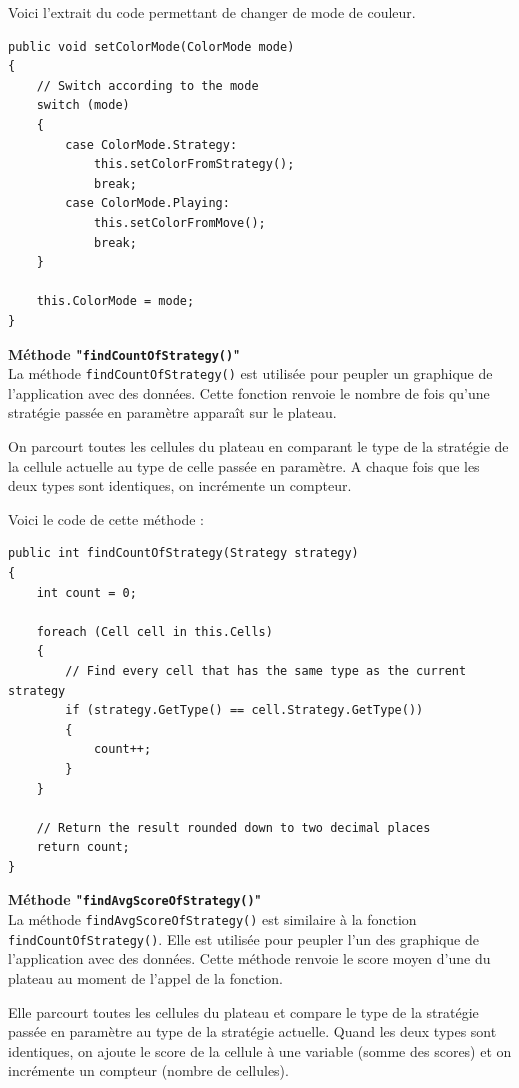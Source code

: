 \documentclass[a4paper]{article}
\begin{document}
Voici l'extrait du code permettant de changer de mode de couleur.
\begin{lstlisting}
public void setColorMode(ColorMode mode)
{
    // Switch according to the mode
    switch (mode)
    {
        case ColorMode.Strategy:
            this.setColorFromStrategy();
            break;
        case ColorMode.Playing:
            this.setColorFromMove();
            break;
    }

    this.ColorMode = mode;
}
\end{lstlisting}


\textbf{Méthode "\texttt{findCountOfStrategy()}"}\\
La méthode \texttt{findCountOfStrategy()} est utilisée pour peupler un graphique de l'application avec des données. Cette fonction renvoie le nombre de fois qu'une stratégie passée en paramètre apparaît sur le plateau.

On parcourt toutes les cellules du plateau en comparant le type de la stratégie de la cellule actuelle au type de celle passée en paramètre. A chaque fois que les deux types sont identiques, on incrémente un compteur.

Voici le code de cette méthode :
\begin{lstlisting}
public int findCountOfStrategy(Strategy strategy)
{
    int count = 0;

    foreach (Cell cell in this.Cells)
    {
        // Find every cell that has the same type as the current strategy
        if (strategy.GetType() == cell.Strategy.GetType())
        {
            count++;
        }
    }

    // Return the result rounded down to two decimal places
    return count;
}
\end{lstlisting}

\pagebreak
\textbf{Méthode "\texttt{findAvgScoreOfStrategy()}"}\\
La méthode \texttt{findAvgScoreOfStrategy()} est similaire à la fonction \texttt{findCountOfStrategy()}. Elle est utilisée pour peupler l'un des graphique de l'application avec des données. Cette méthode renvoie le score moyen d'une du plateau au moment de l'appel de la fonction.

Elle parcourt toutes les cellules du plateau et compare le type de la stratégie passée en paramètre au type de la stratégie actuelle. Quand les deux types sont identiques, on ajoute le score de la cellule à une variable (somme des scores) et on incrémente un compteur (nombre de cellules).
\end{document}
